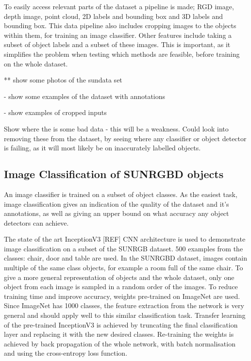 \documentclass[11pt]{article}
\begin{document}
To easily access relevant parts of the dataset a pipeline is made; RGD image, depth image, point cloud, 2D labels and bounding box and 3D labels and bounding box. This data pipeline also includes cropping images to the objects within them, for training an image classifier. Other features include taking a subset of object labels and a subset of these images. This is important, as it simplifies the problem when testing which methods are feasible, before training on the whole dataset.

** show some photos of the sundata set

- show some examples of the dataset with annotations

- show examples of cropped inputs

Show where the is some bad data -  this will be a weakness. Could look into removing these from the dataset, by seeing where any classifier or object detector is failing, as it will most likely be on inaccurately labelled objects.

\subsection*{Image Classification of SUNRGBD objects}
An image classifier is trained on a subset of object classes. As the easiest task, image classification gives an indication of the quality of the dataset and it's annotations, as well as giving an upper bound on what accuracy any object detectors can achieve.

The state of the art InceptionV3 [REF] CNN architecture is used to demonstrate image classification on a subset of the SUNRGB dataset. 500 examples from the classes: chair, door and table are used. In the SUNRGBD dataset, images contain multiple of the same class objects, for example a room full of the same chair. To give a more general representation of objects and the whole dataset, only one object from each image is sampled in a random order of the images. To reduce training time and improve accuracy, weights pre-trained on ImageNet are used. Since ImageNet has 1000 classes, the feature extraction from the network is very general and should apply well to this similar classification task. Transfer learning of the pre-trained InceptionV3 is achieved by truncating the final classification layer and replacing it with the new desired classes. Re-training the weights is achieved by back propagation of the whole network, with batch normalisation and using the cross-entropy loss function.




\end{document}
